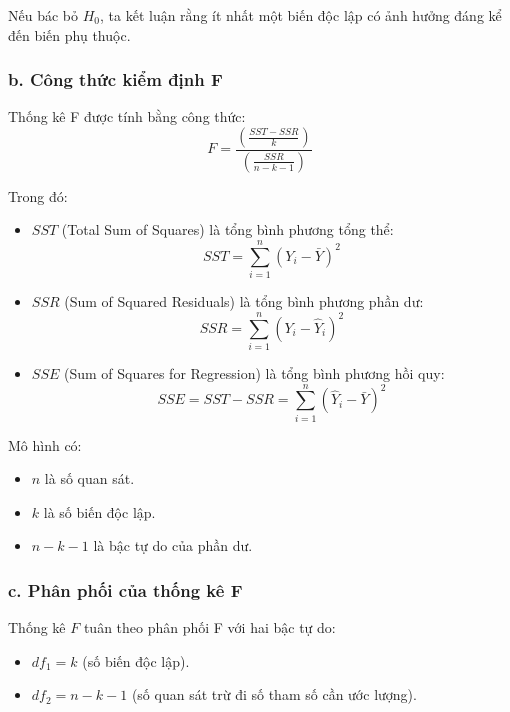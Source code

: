 Nếu bác bỏ \( H_0 \), ta kết luận rằng ít nhất một biến độc lập có ảnh hưởng đáng kể đến biến phụ thuộc.

\subsubsection{b. Công thức kiểm định F}
Thống kê F được tính bằng công thức:
\begin{equation}
F = \frac{\left( \frac{SST - SSR}{k} \right)}{\left( \frac{SSR}{n - k - 1} \right)}
\end{equation}

Trong đó:
\begin{itemize}
    \item \( SST \) (Total Sum of Squares) là tổng bình phương tổng thể:
    \begin{equation}
    SST = \sum_{i=1}^{n} (Y_i - \bar{Y})^2
    \end{equation}
    \item \( SSR \) (Sum of Squared Residuals) là tổng bình phương phần dư:
    \begin{equation}
    SSR = \sum_{i=1}^{n} (Y_i - \hat{Y}_i)^2
    \end{equation}
    \item \( SSE \) (Sum of Squares for Regression) là tổng bình phương hồi quy:
    \begin{equation}
    SSE = SST - SSR = \sum_{i=1}^{n} (\hat{Y}_i - \bar{Y})^2
    \end{equation}
\end{itemize}

Mô hình có:
\begin{itemize}
    \item \( n \) là số quan sát.
    \item \( k \) là số biến độc lập.
    \item \( n - k - 1 \) là bậc tự do của phần dư.
\end{itemize}

\subsubsection{c. Phân phối của thống kê F}
Thống kê \( F \) tuân theo phân phối F với hai bậc tự do:
\begin{itemize}
    \item \( df_1 = k \) (số biến độc lập).
    \item \( df_2 = n - k - 1 \) (số quan sát trừ đi số tham số cần ước lượng).
\end{itemize}

